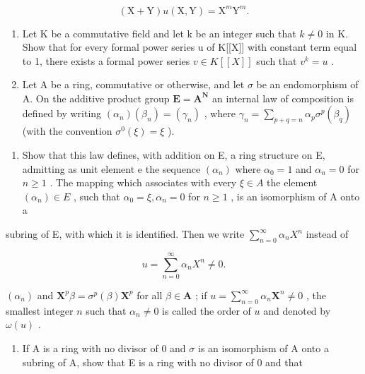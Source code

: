 \[
(\mathrm{X} + \mathrm{Y}) u (\mathrm{X}, \mathrm{Y}) = \mathrm{X} ^ {m} \mathrm{Y} ^ {m}.
\]

\begin{enumerate}
\def\labelenumi{\arabic{enumi}.}
\setcounter{enumi}{23}
\item
  Let K be a commutative field and let k be an integer such that \(k \neq 0\) in K. Show that for every formal power series u of K{[}{[}X{]}{]} with constant term equal to 1, there exists a formal power series \(v \in K[[X]]\) such that \(v^{k} = u\) .
\item
  Let A be a ring, commutative or otherwise, and let \(\sigma\) be an endomorphism of A. On the additive product group \(\mathbf{E} = \mathbf{A}^{\mathbf{N}}\) an internal law of composition is defined by writing \((\alpha_{n})(\beta_{n}) = (\gamma_{n})\) , where \(\gamma_{n} = \sum_{p + q = n}\alpha_{p}\sigma^{p}(\beta_{q})\) (with the convention \(\sigma^0 (\xi) = \xi\) ).
\end{enumerate}

\begin{enumerate}
\def\labelenumi{(\alph{enumi})}
\tightlist
\item
  Show that this law defines, with addition on E, a ring structure on E, admitting as unit element e the sequence \((\alpha_{n})\) where \(\alpha_{0}=1\) and \(\alpha_{n}=0\) for \(n\geqslant1\) . The mapping which associates with every \(\xi\in A\) the element \((\alpha_{n})\in E\) , such that \(\alpha_{0}=\xi,\alpha_{n}=0\) for \(n\geqslant1\) , is an isomorphism of A onto a
\end{enumerate}

subring of E, with which it is identified. Then we write \(\sum_{n=0}^{\infty} \alpha_n X^n\) instead of

\[
u = \sum_ {n = 0} ^ {\infty} \alpha_ {n} X ^ {n} \neq 0.
\]

\((\alpha_{n})\) and \(\mathbf{X}^{p}\beta = \sigma^{p}(\beta)\mathbf{X}^{p}\) for all \(\beta \in \mathbf{A}\) ; if \(u = \sum_{n=0}^{\infty} \alpha_{n}\mathbf{X}^{n} \neq 0\) , the smallest integer \(n\) such that \(\alpha_{n} \neq 0\) is called the order of \(u\) and denoted by \(\omega(u)\) .

\begin{enumerate}
\def\labelenumi{(\alph{enumi})}
\setcounter{enumi}{1}
\tightlist
\item
  If A is a ring with no divisor of 0 and \(\sigma\) is an isomorphism of A onto a subring of A, show that E is a ring with no divisor of 0 and that
\end{enumerate}


